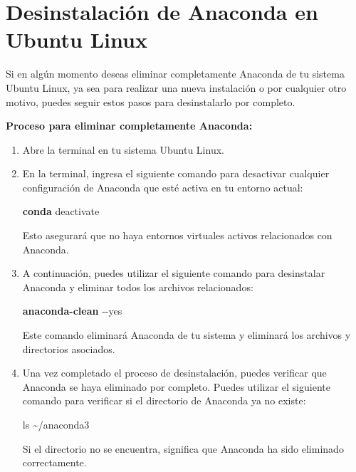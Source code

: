 \documentclass[
  a4paper,
]{article}
\newenvironment{Shaded}{}{}
\newcommand{\AttributeTok}[1]{\textcolor[rgb]{0.84,0.23,0.29}{#1}}
\newcommand{\ExtensionTok}[1]{\textcolor[rgb]{0.84,0.23,0.29}{\textbf{#1}}}
\newcommand{\FunctionTok}[1]{\textcolor[rgb]{0.44,0.26,0.76}{#1}}
\newcommand{\NormalTok}[1]{\textcolor[rgb]{0.14,0.16,0.18}{#1}}
\begin{document}
\hypertarget{desinstalaciuxf3n-de-anaconda-en-ubuntu-linux}{%
\section{Desinstalación de Anaconda en Ubuntu
Linux}\label{desinstalaciuxf3n-de-anaconda-en-ubuntu-linux}}

Si en algún momento deseas eliminar completamente Anaconda de tu sistema
Ubuntu Linux, ya sea para realizar una nueva instalación o por cualquier
otro motivo, puedes seguir estos pasos para desinstalarlo por completo.

\textbf{Proceso para eliminar completamente Anaconda:}

\begin{enumerate}
\def\labelenumi{\arabic{enumi}.}
\item
  Abre la terminal en tu sistema Ubuntu Linux.
\item
  En la terminal, ingresa el siguiente comando para desactivar cualquier
  configuración de Anaconda que esté activa en tu entorno actual:

\begin{Shaded}
\begin{Highlighting}[]
\ExtensionTok{conda}\NormalTok{ deactivate}
\end{Highlighting}
\end{Shaded}

  Esto asegurará que no haya entornos virtuales activos relacionados con
  Anaconda.
\item
  A continuación, puedes utilizar el siguiente comando para desinstalar
  Anaconda y eliminar todos los archivos relacionados:

\begin{Shaded}
\begin{Highlighting}[]
\ExtensionTok{anaconda{-}clean} \AttributeTok{{-}{-}yes}
\end{Highlighting}
\end{Shaded}

  Este comando eliminará Anaconda de tu sistema y eliminará los archivos
  y directorios asociados.
\item
  Una vez completado el proceso de desinstalación, puedes verificar que
  Anaconda se haya eliminado por completo. Puedes utilizar el siguiente
  comando para verificar si el directorio de Anaconda ya no existe:

\begin{Shaded}
\begin{Highlighting}[]
\FunctionTok{ls}\NormalTok{ \textasciitilde{}/anaconda3}
\end{Highlighting}
\end{Shaded}

  Si el directorio no se encuentra, significa que Anaconda ha sido
  eliminado correctamente.
\end{enumerate}
\end{document}
